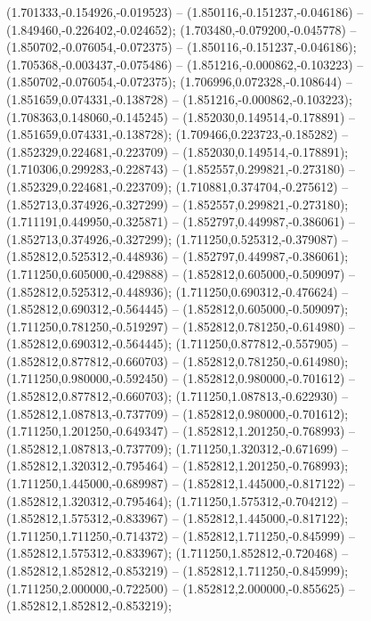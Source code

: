  (1.701333,-0.154926,-0.019523) -- (1.850116,-0.151237,-0.046186) -- (1.849460,-0.226402,-0.024652);
 (1.703480,-0.079200,-0.045778) -- (1.850702,-0.076054,-0.072375) -- (1.850116,-0.151237,-0.046186);
 (1.705368,-0.003437,-0.075486) -- (1.851216,-0.000862,-0.103223) -- (1.850702,-0.076054,-0.072375);
 (1.706996,0.072328,-0.108644) -- (1.851659,0.074331,-0.138728) -- (1.851216,-0.000862,-0.103223);
 (1.708363,0.148060,-0.145245) -- (1.852030,0.149514,-0.178891) -- (1.851659,0.074331,-0.138728);
 (1.709466,0.223723,-0.185282) -- (1.852329,0.224681,-0.223709) -- (1.852030,0.149514,-0.178891);
 (1.710306,0.299283,-0.228743) -- (1.852557,0.299821,-0.273180) -- (1.852329,0.224681,-0.223709);
 (1.710881,0.374704,-0.275612) -- (1.852713,0.374926,-0.327299) -- (1.852557,0.299821,-0.273180);
 (1.711191,0.449950,-0.325871) -- (1.852797,0.449987,-0.386061) -- (1.852713,0.374926,-0.327299);
 (1.711250,0.525312,-0.379087) -- (1.852812,0.525312,-0.448936) -- (1.852797,0.449987,-0.386061);
 (1.711250,0.605000,-0.429888) -- (1.852812,0.605000,-0.509097) -- (1.852812,0.525312,-0.448936);
 (1.711250,0.690312,-0.476624) -- (1.852812,0.690312,-0.564445) -- (1.852812,0.605000,-0.509097);
 (1.711250,0.781250,-0.519297) -- (1.852812,0.781250,-0.614980) -- (1.852812,0.690312,-0.564445);
 (1.711250,0.877812,-0.557905) -- (1.852812,0.877812,-0.660703) -- (1.852812,0.781250,-0.614980);
 (1.711250,0.980000,-0.592450) -- (1.852812,0.980000,-0.701612) -- (1.852812,0.877812,-0.660703);
 (1.711250,1.087813,-0.622930) -- (1.852812,1.087813,-0.737709) -- (1.852812,0.980000,-0.701612);
 (1.711250,1.201250,-0.649347) -- (1.852812,1.201250,-0.768993) -- (1.852812,1.087813,-0.737709);
 (1.711250,1.320312,-0.671699) -- (1.852812,1.320312,-0.795464) -- (1.852812,1.201250,-0.768993);
 (1.711250,1.445000,-0.689987) -- (1.852812,1.445000,-0.817122) -- (1.852812,1.320312,-0.795464);
 (1.711250,1.575312,-0.704212) -- (1.852812,1.575312,-0.833967) -- (1.852812,1.445000,-0.817122);
 (1.711250,1.711250,-0.714372) -- (1.852812,1.711250,-0.845999) -- (1.852812,1.575312,-0.833967);
 (1.711250,1.852812,-0.720468) -- (1.852812,1.852812,-0.853219) -- (1.852812,1.711250,-0.845999);
 (1.711250,2.000000,-0.722500) -- (1.852812,2.000000,-0.855625) -- (1.852812,1.852812,-0.853219);
